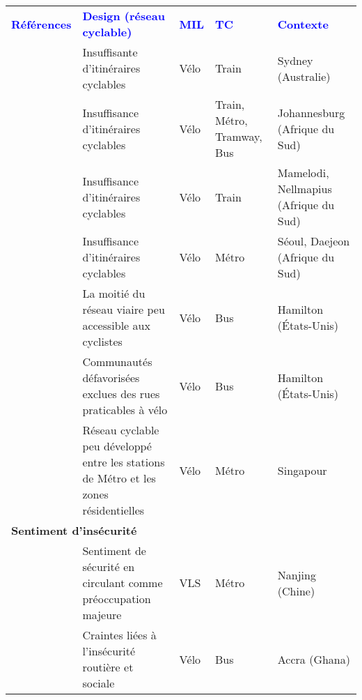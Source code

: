         \begin{longtable}{p{3cm}p{4cm}p{1.5cm}p{1.8cm}p{2.3cm}}
        \hline
        \textcolor{blue}{\textbf{Références}} & \textcolor{blue}{\textbf{Design (réseau cyclable)}} & \textcolor{blue}{\textbf{MIL}} & \textcolor{blue}{\textbf{TC}} & \textcolor{blue}{\textbf{Contexte}}
        \hline
        \endhead
\multicolumn{5}{l}{\textbf{Réseau cyclable peu développé}}\\
    \small{\textcite{zhang_make_2023}}\index{Zhang, Mengyuan|pagebf} & \small{Insuffisante d'itinéraires cyclables} & \small{Vélo} & \small{Train} & \small{Sydney (Australie)}\\
    \small{\textcite{risimati_spatial_2021}}\index{Risimati, Brightnes|pagebf} & \small{Insuffisance d'itinéraires cyclables} & \small{Vélo} & \small{Train, Métro, Tramway, Bus} & \small{Johannesburg (Afrique du Sud)}\\
    \small{\textcite{bechstein_cycling_2010}}\index{Bechstein, Eva|pagebf} & \small{Insuffisance d'itinéraires cyclables} & \small{Vélo} & \small{Train} & \small{Mamelodi, Nellmapius (Afrique du Sud)}\\
    \small{\textcite{lee_strategies_2010}}\index{Lee, Jaeyeong|pagebf} & \small{Insuffisance d'itinéraires cyclables} & \small{Vélo} & \small{Métro} & \small{Séoul, Daejeon (Afrique du Sud)}\\
    \small{\textcite{zuo_first-and-last_2020}}\index{Zuo, Ting|pagebf} & \small{La moitié du réseau viaire peu accessible aux cyclistes} & \small{Vélo} & \small{Bus} & \small{Hamilton (États-Unis)}\\
    \small{\textcite{zuo_promote_2020}}\index{Zuo, Ting|pagebf} & \small{Communautés défavorisées exclues des rues praticables à vélo} & \small{Vélo} & \small{Bus} & \small{Hamilton (États-Unis)}\\
    \small{\textcite{meng_influence_2016}}\index{Meng, Meng|pagebf} & \small{Réseau cyclable peu développé entre les stations de Métro et les zones résidentielles} & \small{Vélo} & \small{Métro} & \small{Singapour}\\
    \hline
\multicolumn{5}{l}{\textbf{Sentiment d'insécurité}}\\
    \small{\textcite{yang_empirical_2016}}\index{Yang, Min|pagebf} & \small{Sentiment de sécurité en circulant comme préoccupation majeure} & \small{VLS} & \small{Métro} & \small{Nanjing (Chine)}\\
    \small{\textcite{quarshie_integrating_2007}}\index{Quarshie, Magnus|pagebf} & \small{Craintes liées à l'insécurité routière et sociale} & \small{Vélo} & \small{Bus} & \small{Accra (Ghana)}\\

\end{longtable}
